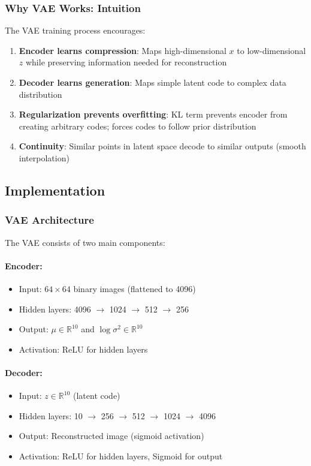 \documentclass[conference]{IEEEtran}
\begin{document}
\subsubsection{Why VAE Works: Intuition}

The VAE training process encourages:
\begin{enumerate}
    \item \textbf{Encoder learns compression}: Maps high-dimensional $x$ to low-dimensional $z$ while preserving information needed for reconstruction
    
    \item \textbf{Decoder learns generation}: Maps simple latent code to complex data distribution
    
    \item \textbf{Regularization prevents overfitting}: KL term prevents encoder from creating arbitrary codes; forces codes to follow prior distribution
    
    \item \textbf{Continuity}: Similar points in latent space decode to similar outputs (smooth interpolation)
\end{enumerate}

\subsection{Implementation}

\subsubsection{VAE Architecture}

The VAE consists of two main components:

\paragraph{Encoder:}
\begin{itemize}
    \item Input: $64 \times 64$ binary images (flattened to 4096)
    \item Hidden layers: 4096 $\rightarrow$ 1024 $\rightarrow$ 512 $\rightarrow$ 256
    \item Output: $\mu \in \mathbb{R}^{10}$ and $\log\sigma^2 \in \mathbb{R}^{10}$
    \item Activation: ReLU for hidden layers
\end{itemize}

\paragraph{Decoder:}
\begin{itemize}
    \item Input: $z \in \mathbb{R}^{10}$ (latent code)
    \item Hidden layers: 10 $\rightarrow$ 256 $\rightarrow$ 512 $\rightarrow$ 1024 $\rightarrow$ 4096
    \item Output: Reconstructed image (sigmoid activation)
    \item Activation: ReLU for hidden layers, Sigmoid for output
\end{itemize}
\end{document}
